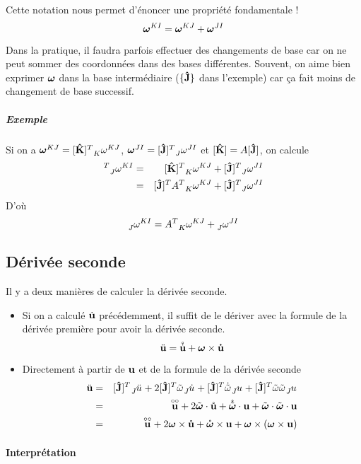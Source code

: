 Cette notation nous permet d'énoncer une propriété fondamentale !
\[ {\bm \omega}^{KI} = {\bm \omega}^{KJ} + {\bm \omega}^{JI} \]

Dans la pratique, il faudra parfois effectuer des changements de base car on ne peut sommer des coordonnées dans des bases différentes.
Souvent, on aime bien exprimer ${\bm \omega}$ dans la base intermédiaire ($\{{\bf\hat{J}}\}$ dans l'exemple) car ça fait moins de changement de base successif.

\subparagraph{Exemple}
Si on a $\omegaf^{KJ} = [\uk]^T \wtr{K}{\omega}{KJ}$, $\omegaf^{JI} = [\uj]^T \wtr{J}{\omega}{JI}$ et $[{\bf\hat{K}}] = A[{\bf\hat{J}}]$, on calcule
\begin{eqnarray*}
  [\uj]^T \wtr{J}{\omega}{KI} &=& [\uk]^T \wtr{K}{\omega}{KJ} + [\uj]^T \wtr{J}{\omega}{JI}\\
                              &=& [\uj]^T A^T \wtr{K}{\omega}{KJ} + [\uj]^T \wtr{J}{\omega}{JI}
\end{eqnarray*}
D'où
\[ \wtr{J}{\omega}{KI} = A^T \wtr{K}{\omega}{KJ} + \wtr{J}{\omega}{JI} \]

\subsection{Dérivée seconde}
Il y a deux manières de calculer la dérivée seconde.
\begin{itemize}
  \item
    Si on a calculé $\dot{\bf u}$ précédemment, il suffit de le dériver avec la formule de la dérivée première pour avoir la dérivée seconde.
    \[ \ddot{\bf u} = \mathring{\dot{\bf u}} + {\bm \omega} \times \dot{\bf u} \]
  \item
    Directement à partir de ${\bf u}$ et de la formule de la dérivée seconde
    \begin{eqnarray*}
      \fvdd{u} &=&  [\uj]^T \wrt{J}{\ddot{u}} + 2 [\uj]^T \omegat\wrt{J}{\dot{u}} + [\uj]^T \dot{\omegat}\wrt{J}{u} + [\uj]^T \omegat\omegat\wrt{J}{u}\\
               &=& \fvrr{u} + 2 \omegaft \cdot \fvr{u} + \omegaftr \cdot \fv{u} + \omegaft \cdot \omegaft \cdot \fv{u}\\
               &=& \fvrr{u} + 2 \omegaf \times \fvr{u} + \omegafr \times \fv{u} + \omegaf \times (\omegaf \times \fv{u})
    \end{eqnarray*}
\end{itemize}

\paragraph{Interprétation}

